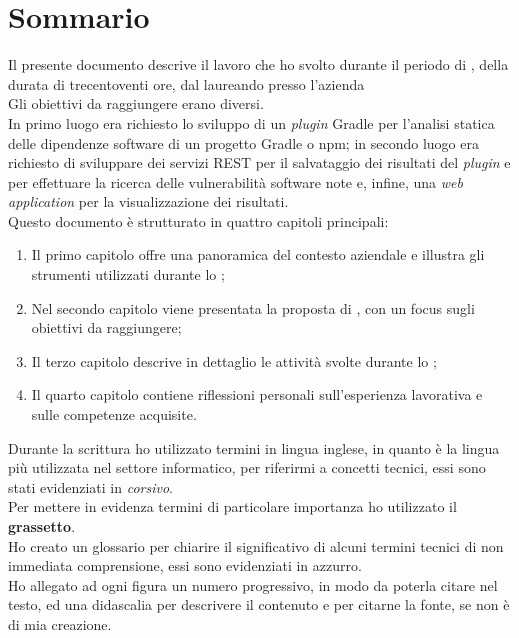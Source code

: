 \cleardoublepage
{}
{}
\begingroup
\let\clearpage\relax
\let\cleardoublepage\relax
\let\cleardoublepage\relax

\chapter*{Sommario}

Il presente documento descrive il lavoro che ho svolto durante il periodo di \stage, della durata di trecentoventi ore, 
dal laureando {\myName} presso l'azienda {\azienda} \\
Gli obiettivi da raggiungere erano diversi.\\
In primo luogo era richiesto lo sviluppo di un \textit{plugin} Gradle per l'analisi statica delle dipendenze software di un progetto Gradle o npm;
in secondo luogo era richiesto di sviluppare dei servizi REST per il salvataggio dei risultati del \textit{plugin} e per effettuare la ricerca
delle vulnerabilità software note e, infine,
una \textit{web application} per la visualizzazione dei risultati.\\
Questo documento è strutturato in quattro capitoli principali:
\begin{enumerate}
    \item Il primo capitolo offre una panoramica del contesto aziendale e illustra gli strumenti utilizzati durante lo \stage;
    \item Nel secondo capitolo viene presentata la proposta di \stage, con un focus sugli obiettivi da raggiungere;
    \item Il terzo capitolo descrive in dettaglio le attività svolte durante lo \stage;
    \item Il quarto capitolo contiene riflessioni personali sull'esperienza lavorativa e sulle competenze acquisite.
\end{enumerate}

\noindent Durante la scrittura ho utilizzato termini in lingua inglese, in quanto è la lingua più utilizzata nel settore informatico, 
per riferirmi a concetti tecnici, essi sono stati evidenziati in \textit{corsivo}.\\
Per mettere in evidenza termini di particolare importanza ho utilizzato il \textbf{grassetto}.\\
Ho creato un glossario per chiarire il significativo di alcuni termini tecnici di non immediata comprensione, essi sono evidenziati in azzurro.\\
Ho allegato ad ogni figura un numero progressivo, in modo da poterla citare nel testo, ed una didascalia per descrivere il contenuto
e per citarne la fonte, se non è di mia creazione.\\





\endgroup

\vfill
